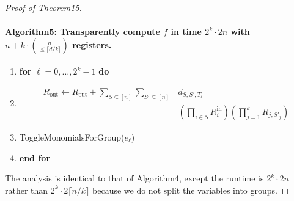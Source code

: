 \begin{proof}[Proof of Theorem15]
\paragraph{Algorithm5: Transparently compute $f$ in time $2^k\cdot2n$ with $n+k\cdot\binom n{\leq\lceil d/k\rceil}$ registers.}
\begin{enumerate}[label=\arabic*:]
\item \textbf{for} $\ell=0,\ldots,2^k-1$ \textbf{do}
\item \[\begin{aligned}R_{\mathrm{out}}\leftarrow R_{\mathrm{out}}+\sum_{S\subseteq[n]}\sum_{S'\subseteq[n]}&d_{S,S',T_{\ell}}\\
&\mathord{}(\prod_{i\in S}R_i^{\mathrm{in}})(\prod_{j=1}^kR_{j,S'_j})\end{aligned}\]
\item ToggleMonomialsForGroup($e_{\ell}$)
\item \textbf{end for}
\end{enumerate}
The analysis is identical to that of Algorithm4, except the runtime is $2^k\cdot2n$ rather than $2^k\cdot2\lceil n/k\rceil$ because we do not split the variables into groups.
\end{proof}
